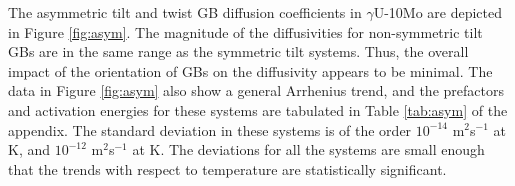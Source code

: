 \documentclass{elsarticle}
\providecommand{\DIFadd}[1]{{\protect\color{blue} \sf #1}} %
\providecommand{\DIFdel}[1]{}
\providecommand{\DIFaddbegin}{} %
\providecommand{\DIFaddend}{} %
\providecommand{\DIFdelbegin}{} %
\providecommand{\DIFdelend}{} %
\begin{document}
The \DIFdelbegin \DIFdel{diffusion coefficients for }\DIFdelend asymmetric tilt and twist \DIFdelbegin \DIFdel{GBs }\DIFdelend \DIFaddbegin \DIFadd{GB diffusion coefficients }\DIFaddend in $\gamma$U-10Mo are depicted in Figure \DIFdelbegin \DIFdel{\ref{fig:u10mo}(b). The variance in the diffusion coefficient with respect to orientation is very minor, and less than that for symmetric tilt GBs. The }\DIFdelend \DIFaddbegin \DIFadd{\ref{fig:asym}. The }\DIFaddend magnitude of the \DIFdelbegin \DIFdel{diffusivity }\DIFdelend \DIFaddbegin \DIFadd{diffusivities }\DIFaddend for non-symmetric tilt GBs \DIFdelbegin \DIFdel{is }\DIFdelend \DIFaddbegin \DIFadd{are }\DIFaddend in the same range as the symmetric tilt systems. Thus, the overall impact of the orientation of GBs on the diffusivity appears to be minimal. The data in Figure \DIFdelbegin \DIFdel{\ref{fig:u10mo}(b) still }\DIFdelend \DIFaddbegin \DIFadd{\ref{fig:asym} also }\DIFaddend show a general Arrhenius trend, and the prefactors and activation energies for these systems are tabulated in Table \ref{tab:asym} \DIFdelbegin \DIFdel{in }\DIFdelend \DIFaddbegin \DIFadd{of }\DIFaddend the appendix. The standard deviation in these systems is \DIFdelbegin \DIFdel{approximately $2.8 \times 10^{-12}$ }\DIFdelend \DIFaddbegin \DIFadd{of the order $10^{-14}$ }\DIFaddend m$^2$s$^{-1}$ at \DIFdelbegin \DIFdel{1200 }\DIFdelend \DIFaddbegin \DIFadd{600 }\DIFaddend K, and \DIFdelbegin \DIFdel{$2.8 \times 10^{-13}$ }\DIFdelend \DIFaddbegin \DIFadd{$ 10^{-12}$ }\DIFaddend m$^2$s$^{-1}$ at \DIFdelbegin \DIFdel{600 }\DIFdelend \DIFaddbegin \DIFadd{1200 }\DIFaddend K. The \DIFdelbegin \DIFdel{general errors for all systems are sufficiently small }\DIFdelend \DIFaddbegin \DIFadd{deviations for all the systems are small enough }\DIFaddend that the trends with respect to temperature are statistically significant.
\end{document}
